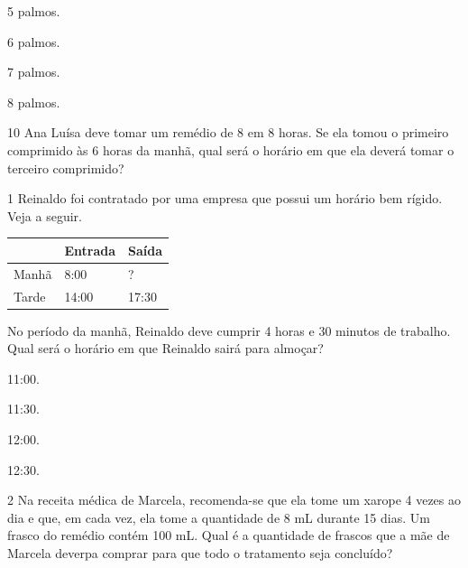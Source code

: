 \begin{minipage}{.5\textwidth}
\begin{escolha}
\item
  5 palmos.
\item
  6 palmos.
\item
  7 palmos.
\item
  8 palmos.
\end{escolha}
\end{minipage}

\num{10} Ana Luísa deve tomar um remédio de 8 em 8 horas. Se ela tomou o primeiro
comprimido às 6 horas da manhã, qual será o horário em que ela deverá tomar
o terceiro comprimido?

\begin{mdframed}[linewidth=2pt,linecolor=salmao,roundcorner=2pt]


\end{mdframed}



\num{1} Reinaldo foi contratado por uma empresa que possui um horário bem rígido.
Veja a seguir.

\begin{longtable}[]{@{}lll@{}}
\toprule
& Entrada & Saída\tabularnewline
\midrule
\endhead
Manhã & 8:00 & ?\tabularnewline
Tarde & 14:00 & 17:30\tabularnewline
\bottomrule
\end{longtable}


No período da manhã, Reinaldo deve
cumprir 4 horas e 30 minutos de trabalho. Qual será o horário em que
Reinaldo sairá para almoçar?

\begin{escolha}
\item
  11:00.
\item
  11:30.
\item
  12:00.
\item
  12:30.
\end{escolha}

\pagebreak
\num{2} Na receita médica de Marcela, recomenda-se que ela tome um xarope 4 vezes ao
dia e que, em cada vez, ela tome a quantidade de 8 mL durante 15 dias. Um
frasco do remédio contém 100 mL. Qual é a quantidade de
frascos que a mãe de Marcela deverpa comprar para que todo o tratamento
seja concluído?

